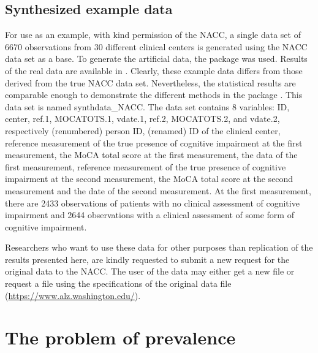\documentclass[
  nojss]{jss}
\begin{document}
\hypertarget{synthesized-example-data}{%
\subsection{Synthesized example data}\label{synthesized-example-data}}

For use as an example, with kind permission of the NACC, a single data
set of 6670 observations from 30 different clinical centers is generated
using the NACC data set as a base. To generate the artificial data, the
 package  \citep{nowok_synthpop_2016} was
used. Results of the real data are available in
\citep{Landsheer_In_press}. Clearly, these example data differs from
those derived from the true NACC data set. Nevertheless, the statistical
results are comparable enough to demonstrate the different methods in
the package . This data set is named
synthdata\_NACC. The data set contains 8 variables: ID, center, ref.1,
MOCATOTS.1, vdate.1, ref.2, MOCATOTS.2, and vdate.2, respectively
(renumbered) person ID, (renamed) ID of the clinical center, reference
measurement of the true presence of cognitive impairment at the first
measurement, the MoCA total score at the first measurement, the data of
the first measurement, reference measurement of the true presence of
cognitive impairment at the second measurement, the MoCA total score at
the second measurement and the date of the second measurement. At the
first measurement, there are 2433 observations of patients with no
clinical assessment of cognitive impairment and 2644 observations with a
clinical assessment of some form of cognitive impairment.

Researchers who want to use these data for other purposes than
replication of the results presented here, are kindly requested to
submit a new request for the original data to the NACC. The user of the
data may either get a new file or request a file using the
specifications of the original data file
(\url{https://www.alz.washington.edu/}).

\hypertarget{the-problem-of-prevalence}{%
\section{The problem of prevalence}\label{the-problem-of-prevalence}}
\end{document}
